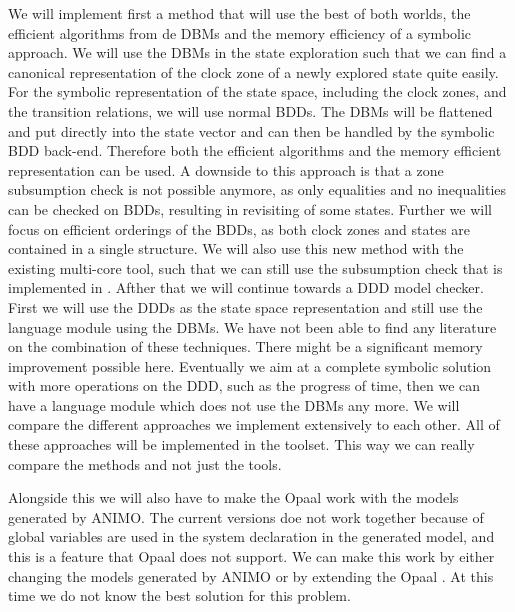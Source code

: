 We will implement first a method that will use the best of both worlds, the efficient algorithms from de DBMs and the memory efficiency of a symbolic approach. We will use the DBMs in the state exploration such that we can find a canonical representation of the clock zone of a newly explored state quite easily. For the symbolic representation of the state space, including the clock zones, and the transition relations, we will use normal BDDs. The DBMs will be flattened and put directly into the state vector and can then be handled by the symbolic BDD back-end. Therefore both the efficient algorithms and the memory efficient representation can be used. A downside to this approach is that a zone subsumption check is not possible anymore, as only equalities and no inequalities can be checked on BDDs, resulting in revisiting of some states. Further we will focus on efficient orderings of the BDDs, as both clock zones and states are contained in a single structure. We will also use this new method with the existing multi-core tool, such that we can still use the subsumption check that is implemented in \ltsmin{}. Afther that we will continue towards a DDD model checker. First we will use the DDDs as the state space representation and still use the language module using the DBMs. We have not been able to find any literature on the combination of these techniques. There might be a significant memory improvement possible here. Eventually we aim at a complete symbolic solution with more operations on the DDD, such as the progress of time, then we can have a language module which does not use the DBMs any more. We will compare the different approaches we implement extensively to each other. All of these approaches will be implemented in the \ltsmin{} toolset. This way we can really compare the methods and not just the tools.

Alongside this we will also have to make the Opaal \pins{} work with the \uppaal{} models generated by ANIMO. The current versions doe not work together because of global variables are used in the system declaration in the generated model, and this is a feature that Opaal does not support. We can make this work by either changing the models generated by ANIMO or by extending the Opaal \pins{}. At this time we do not know the best solution for this problem.


